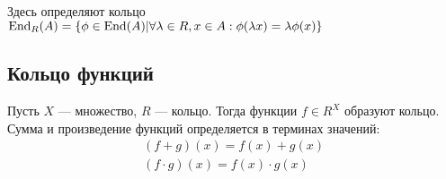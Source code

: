 \documentclass[a4paper]{report}
\begin{document}
    Здесь определяют кольцо $\operatorname{End}_R(A) = \left\{\phi \in \operatorname{End}(A)\middle|\forall \lambda \in R, x \in A: \phi(\lambda x) = \lambda \phi(x)\right\}$

    \subsection{Кольцо функций}
    Пусть $X$ --- множество, $R$ --- кольцо.
    Тогда функции $f \in R^X$ образуют кольцо.
    Сумма и произведение функций определяется в терминах значений:
    \begin{gather*}
    (f + g)(x)
        = f(x) + g(x)\\
        (f \cdot g)(x) = f(x) \cdot g(x) \\
    \end{gather*}
\end{document}
